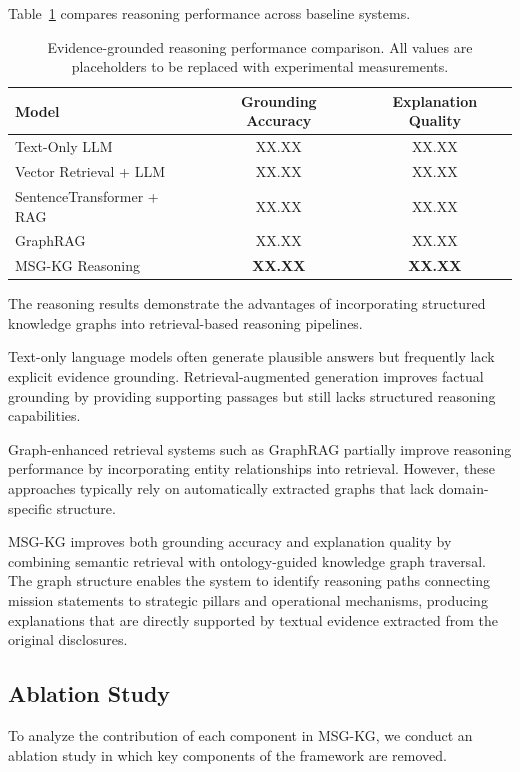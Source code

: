 \documentclass[11pt]{article}
\begin{document}
Table~\ref{tab:reasoning_results} compares reasoning performance across baseline systems.

\begin{table}[h]
\centering
\caption{Evidence-grounded reasoning performance comparison. All values are placeholders to be replaced with experimental measurements.}
\label{tab:reasoning_results}
\begin{tabular}{lcc}
\hline
Model & Grounding Accuracy & Explanation Quality \\
\hline
Text-Only LLM & XX.XX & XX.XX \\
Vector Retrieval + LLM & XX.XX & XX.XX \\
SentenceTransformer + RAG & XX.XX & XX.XX \\
GraphRAG & XX.XX & XX.XX \\
MSG-KG Reasoning & \textbf{XX.XX} & \textbf{XX.XX} \\
\hline
\end{tabular}

\end{table}

The reasoning results demonstrate the advantages of incorporating structured knowledge graphs into retrieval-based reasoning pipelines.

Text-only language models often generate plausible answers but frequently lack explicit evidence grounding. Retrieval-augmented generation improves factual grounding by providing supporting passages but still lacks structured reasoning capabilities.

Graph-enhanced retrieval systems such as GraphRAG partially improve reasoning performance by incorporating entity relationships into retrieval. However, these approaches typically rely on automatically extracted graphs that lack domain-specific structure.

MSG-KG improves both grounding accuracy and explanation quality by combining semantic retrieval with ontology-guided knowledge graph traversal. The graph structure enables the system to identify reasoning paths connecting mission statements to strategic pillars and operational mechanisms, producing explanations that are directly supported by textual evidence extracted from the original disclosures.

\subsection{Ablation Study}

To analyze the contribution of each component in MSG-KG, we conduct an ablation study in which key components of the framework are removed.
\end{document}
